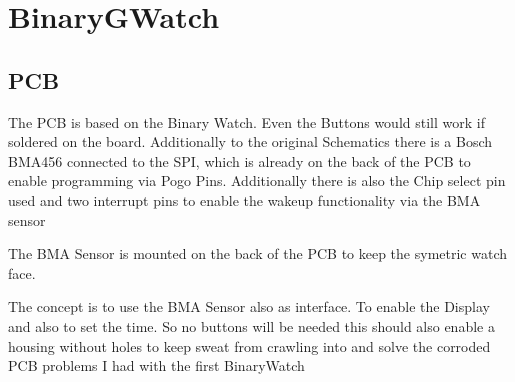 \section{BinaryGWatch}
\subsection{PCB}
The PCB is based on the Binary Watch. Even the Buttons would still work if soldered on the board. Additionally to the original Schematics there is a Bosch BMA456 connected to the SPI, which is already on the back of the PCB to enable programming via Pogo Pins. Additionally there is also the Chip select pin used and two interrupt pins to enable the wakeup functionality via the BMA sensor

The BMA Sensor is mounted on the back of the PCB to keep the symetric watch face. 

The concept is to use the BMA Sensor also as interface. To enable the Display and also to set the time. So no buttons will be needed this should also enable a housing without holes to keep sweat from crawling into and solve the corroded PCB problems I had with the first BinaryWatch